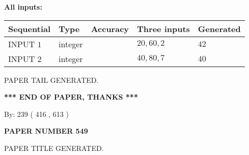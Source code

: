 \documentclass[12pt]{article}
\begin{document}
   
   
   
\noindent\vspace{0.1in}\hspace{-0.08in} {\textbf{\Large{All inputs: }}}
   
   
  
  
\noindent\begin{tabular}{|l|l|l|l|l|}
\hline
 Sequential & Type & Accuracy & Three inputs & Generated \\ 
\hline
 
 
  INPUT $  1 $ & integer &  & $
 20
 , 
 60
 , 
 2
 $ & $ 42 $ 
 \\  \hline  
 
 
  INPUT $  2 $ & integer &  & $
 40
 , 
 80
 , 
 7
 $ & $ 40 $ 
 \\  \hline  
 \end{tabular}
   
   
   
   
   
   
 \vspace{0.2in}
 
   
   
\vspace{2.0in} PAPER TAIL GENERATED.
   
   
   
   
\vspace{1.0in} 
{\textbf{\large{ *** END OF PAPER, THANKS *** }}} 
   
   
\hspace{1.0in} By: 
 239 ( 416 ,  613 )
   
   
   
   
\newpage 
\setcounter{page}{ 
   549001 } 
   
   
   
   
 {\textbf{ \Large{ PAPER NUMBER  549  }}}
   
   
\vspace{0.2in}
   
   
   
   
   
   
   
   
 \vspace{0.2in}
 
 
 
 
   
   
 PAPER TITLE GENERATED.
   
   
   
\vspace{0.2in}
   
\end{document}
